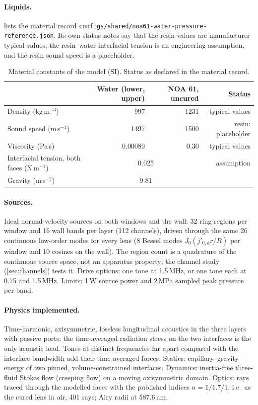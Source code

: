 \documentclass[11pt,a4paper]{article}
\numberwithin{equation}{section}
\newcommand{\file}[1]{\nolinkurl{#1}}
\begin{document}
\paragraph{Liquids.}  lists the material record
\file{configs/shared/noa61-water-pressure-reference.json}. Its own status notes
say that the resin values are manufacturer typical values, the resin--water
interfacial tension is an engineering assumption, and the resin sound speed is a
placeholder.

\begin{table}[htbp]\centering\small
\caption{Material constants of the model (SI). Status as declared in the material record.}\label{tab:materials}
\begin{tabular}{@{}lrrr@{}}
\toprule
 & Water (lower, upper) & NOA 61, uncured & Status \\
\midrule
Density (kg\,m$^{-3}$) & 997 & 1231 & typical values \\
Sound speed (m\,s$^{-1}$) & 1497 & 1500 & resin: placeholder \\
Viscosity (Pa\,s) & 0.00089 & 0.30 & typical values \\
Interfacial tension, both faces (N\,m$^{-1}$) & \multicolumn{2}{c}{0.025} & assumption \\
Gravity (m\,s$^{-2}$) & \multicolumn{2}{c}{9.81} & \\
\bottomrule
\end{tabular}
\end{table}

\paragraph{Sources.} Ideal normal-velocity sources on both windows and the wall:
32 ring regions per window and 16 wall bands per layer (112 channels), driven
through the same 26 continuous low-order modes for every lens (8 Bessel modes
$J_0(j'_{0,k}r/R)$ per window and 10 cosines on the wall). The region count is a
quadrature of the continuous source space, not an apparatus property; the
channel study (\cref{sec:channels}) tests it. Drive options: one tone at
1.5\,MHz, or one tone each at 0.75 and 1.5\,MHz. Limits: 1\,W source power and
2\,MPa sampled peak pressure per band.

\paragraph{Physics implemented.} Time-harmonic, axisymmetric, lossless
longitudinal acoustics in the three layers with passive ports; the time-averaged
radiation stress on the two interfaces is the only acoustic load. Tones at
distinct frequencies far apart compared with the interface bandwidth add their
time-averaged forces. Statics: capillary--gravity energy of two pinned,
volume-constrained interfaces. Dynamics: inertia-free three-fluid Stokes flow
(creeping flow) on a moving axisymmetric domain. Optics: rays traced through the
modelled faces with the published indices $n=1/1.7/1$, i.e.\ as the cured lens in
air, 401 rays; Airy radii at 587.6\,nm.
\end{document}
